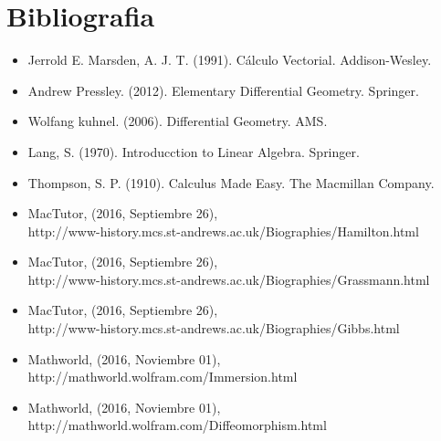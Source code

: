 
\section{Bibliografia}
\begin{itemize}
\item Jerrold E. Marsden, A. J. T. (1991). Cálculo Vectorial. Addison-Wesley. 
\item Andrew Pressley. (2012). Elementary Differential Geometry. Springer. 
\item Wolfang kuhnel. (2006). Differential Geometry. AMS.
\item Lang, S. (1970). Introducction to Linear Algebra. Springer. 
\item Thompson, S. P. (1910). Calculus Made Easy. The Macmillan Company. 
\item MacTutor, (2016, Septiembre 26), \\  http://www-history.mcs.st-andrews.ac.uk/Biographies/Hamilton.html
\item MacTutor, (2016, Septiembre 26), \\ http://www-history.mcs.st-andrews.ac.uk/Biographies/Grassmann.html
\item MacTutor, (2016, Septiembre 26), \\ http://www-history.mcs.st-andrews.ac.uk/Biographies/Gibbs.html
\item Mathworld, (2016, Noviembre 01), \\ http://mathworld.wolfram.com/Immersion.html 
\item Mathworld, (2016, Noviembre 01), \\ http://mathworld.wolfram.com/Diffeomorphism.html
\end{itemize}
